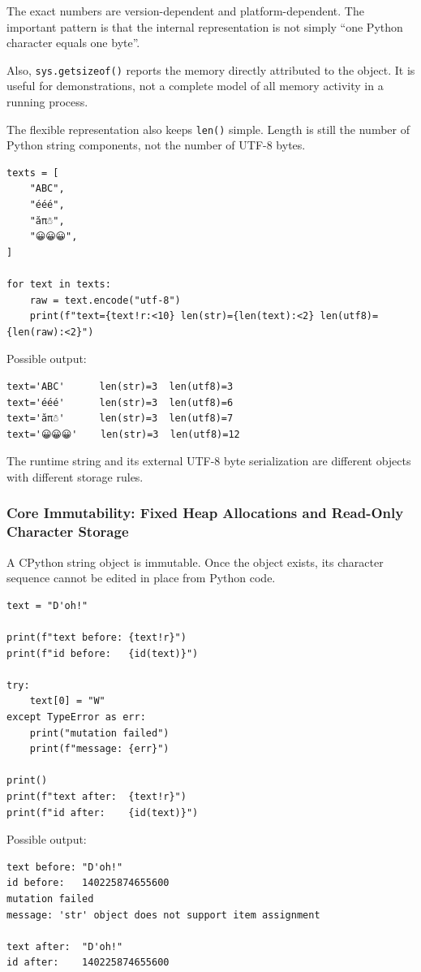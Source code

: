 The exact numbers are version-dependent and platform-dependent. The important pattern is that the internal representation is not simply ``one Python character equals one byte''.

Also, \texttt{sys.getsizeof()} reports the memory directly attributed to the object. It is useful for demonstrations, not a complete model of all memory activity in a running process.

The flexible representation also keeps \texttt{len()} simple. Length is still the number of Python string components, not the number of UTF-8 bytes.

\begin{verbatim}
texts = [
    "ABC",
    "ééé",
    "ăπ☃",
    "😀😀😀",
]

for text in texts:
    raw = text.encode("utf-8")
    print(f"text={text!r:<10} len(str)={len(text):<2} len(utf8)={len(raw):<2}")
\end{verbatim}

Possible output:

\begin{verbatim}
text='ABC'      len(str)=3  len(utf8)=3
text='ééé'      len(str)=3  len(utf8)=6
text='ăπ☃'      len(str)=3  len(utf8)=7
text='😀😀😀'    len(str)=3  len(utf8)=12
\end{verbatim}

The runtime string and its external UTF-8 byte serialization are different objects with different storage rules.

\subsubsection{Core Immutability: Fixed Heap Allocations and Read-Only Character Storage}

A CPython string object is immutable. Once the object exists, its character sequence cannot be edited in place from Python code.

\begin{verbatim}
text = "D'oh!"

print(f"text before: {text!r}")
print(f"id before:   {id(text)}")

try:
    text[0] = "W"
except TypeError as err:
    print("mutation failed")
    print(f"message: {err}")

print()
print(f"text after:  {text!r}")
print(f"id after:    {id(text)}")
\end{verbatim}

Possible output:

\begin{verbatim}
text before: "D'oh!"
id before:   140225874655600
mutation failed
message: 'str' object does not support item assignment

text after:  "D'oh!"
id after:    140225874655600
\end{verbatim}

